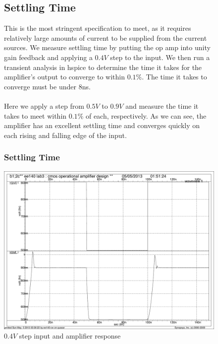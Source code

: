 \documentclass[]{article}
\begin{document}
		\begin{figure}
			\subsection{Settling Time}
			This is the most stringent specification to meet, as it requires relatively large amounts of current to be supplied from the current sources. We measure settling time by putting the op amp into unity gain feedback and applying a $0.4V$ step to the input. We then run a transient analysis in hspice to determine the time it takes for the amplifier's output to converge to within $0.1\%$. The time it takes to converge must be under $8$ns.\\ \\
			Here we apply a step from $0.5V$ to $0.9V$ and measure the time it takes to meet within $0.1\%$ of each, respectively. As we can see, the amplifier has an excellent settling time and converges quickly on each rising and falling edge of the input. 
				\subsubsection{Settling Time}
				\includegraphics[width=1.1\textwidth]{SETTLING_TIME_full_FINAL.pdf}
				\caption{$0.4V$ step input and amplifier response}
		\end{figure}
		
\end{document}

